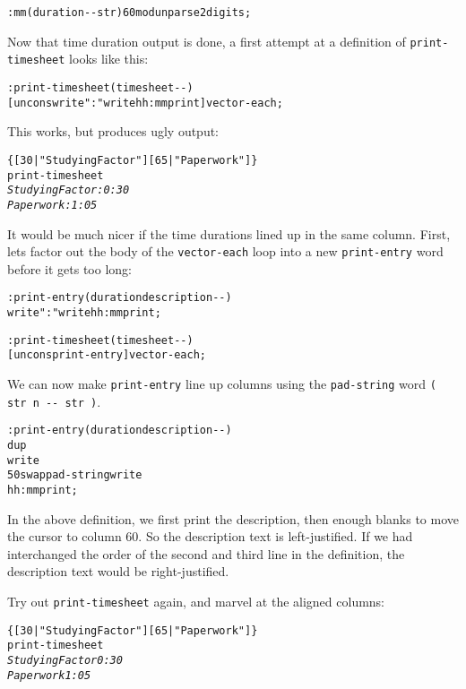 \documentclass[english]{book}
\begin{document}
\begin{alltt}
: mm ( duration -{}- str ) 60 mod unparse 2 digits ;
\end{alltt}
Now that time duration output is done, a first attempt at a definition
of \texttt{print-timesheet} looks like this:

\begin{alltt}
: print-timesheet ( timesheet -{}- )
    {[} uncons write ": " write hh:mm print {]} vector-each ;
\end{alltt}
This works, but produces ugly output:

\begin{alltt}
\{ {[} 30 | "Studying Factor" {]} {[} 65 | "Paperwork" {]} \}
print-timesheet
\emph{Studying Factor: 0:30}
\emph{Paperwork: 1:05}
\end{alltt}

It would be much nicer if the time durations lined up in the same
column. First, lets factor out the body of the \texttt{vector-each}
loop into a new \texttt{print-entry} word before it gets too long:

\begin{alltt}
: print-entry ( duration description -{}- )
    write ": " write hh:mm print ;

: print-timesheet ( timesheet -{}- )
    {[} uncons print-entry {]} vector-each ;
\end{alltt}

We can now make \texttt{print-entry} line up columns using the \texttt{pad-string}
word \texttt{( str n -{}- str )}.

\begin{alltt}
: print-entry ( duration description -{}- )
    dup
    write
    50 swap pad-string write 
    hh:mm print ;
\end{alltt}

In the above definition, we first print the description, then enough
blanks to move the cursor to column 60. So the description text is
left-justified. If we had interchanged the order of the second and
third line in the definition, the description text would be right-justified.

Try out \texttt{print-timesheet} again, and marvel at the aligned
columns:

\begin{alltt}
\{ {[} 30 | "Studying Factor" {]} {[} 65 | "Paperwork" {]} \}
print-timesheet
\emph{Studying Factor                                   0:30}
\emph{Paperwork                                         1:05}
\end{alltt}
\end{document}
